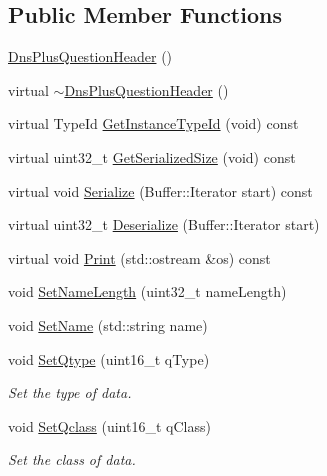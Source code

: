 \subsection*{Public Member Functions}
\begin{DoxyCompactItemize}
\item 
\hyperlink{classns3_1_1DnsPlusQuestionHeader_a3007f16f1486ea4d9e92f0a16304db5c}{Dns\-Plus\-Question\-Header} ()
\item 
virtual \hyperlink{classns3_1_1DnsPlusQuestionHeader_a2491f3d2ea7e19769fe1964405d12da1}{$\sim$\-Dns\-Plus\-Question\-Header} ()
\item 
virtual Type\-Id \hyperlink{classns3_1_1DnsPlusQuestionHeader_a3a22c5fdc183804309a94aad3e09c054}{Get\-Instance\-Type\-Id} (void) const 
\item 
virtual uint32\-\_\-t \hyperlink{classns3_1_1DnsPlusQuestionHeader_a9e90cac30d95e95faaaeeab35fe9c15e}{Get\-Serialized\-Size} (void) const 
\item 
virtual void \hyperlink{classns3_1_1DnsPlusQuestionHeader_a7560e6469a4e5afdf4df095e7e6d6eab}{Serialize} (Buffer\-::\-Iterator start) const 
\item 
virtual uint32\-\_\-t \hyperlink{classns3_1_1DnsPlusQuestionHeader_ac75fc840943cca37028eb0c8a23c4bea}{Deserialize} (Buffer\-::\-Iterator start)
\item 
virtual void \hyperlink{classns3_1_1DnsPlusQuestionHeader_a8ef5f712bae1caef0c7f37590fa094c2}{Print} (std\-::ostream \&os) const 
\item 
void \hyperlink{classns3_1_1DnsPlusQuestionHeader_aaad52033f6142d4c0210fdeb68b95d15}{Set\-Name\-Length} (uint32\-\_\-t name\-Length)
\item 
void \hyperlink{classns3_1_1DnsPlusQuestionHeader_a2fe3d4e1f1eea6817a83e5008d308edf}{Set\-Name} (std\-::string name)
\item 
void \hyperlink{classns3_1_1DnsPlusQuestionHeader_ab4300d1305dfed701fd94d803b5741cd}{Set\-Qtype} (uint16\-\_\-t q\-Type)
\begin{DoxyCompactList}\small\item\em Set the type of data. \end{DoxyCompactList}\item 
void \hyperlink{classns3_1_1DnsPlusQuestionHeader_a8281d02c53d1f3ef5228dd1ddce35759}{Set\-Qclass} (uint16\-\_\-t q\-Class)
\begin{DoxyCompactList}\small\item\em Set the class of data. \end{DoxyCompactList}\item 

\end{DoxyCompactItemize}
